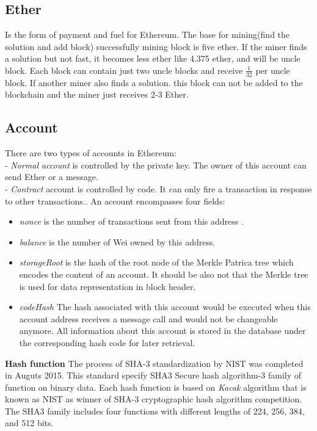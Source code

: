 \subsection{Ether}
 Is the form of payment and fuel for Ethereum. The base for mining(find the solution and add block) successfully mining block is five ether. If the miner finds a solution but not fast, it becomes less ether like 4.375 ether, and will be uncle block. Each block can contain just two uncle blocks and receive $\frac{1}{32}$ per uncle block. If another miner also finds a solution. this block can not be added to the blockchain and the miner just receives 2-3 Ether\cite{Egbertsen}. 
\subsection{Account}
There are two types of accounts in Ethereum:\\
- \textit{Normal account} is controlled by the private key. The owner of this account can send Ether or a message.\\
- \textit{Contract} account is controlled by code. It can only fire a transaction in response to other transactions.\cite{Egbertsen}. An account encompasses four fields:\\
 \begin{itemize}
     \item \textit{nonce} is the number of transactions sent from this address \cite{Gavin}.
     \item \textit{balance} is the number of Wei owned by this address\cite{Gavin}.
     \item \textit{storageRoot} is the hash of the root node of the Merkle Patrica tree which encodes the content of an account. It should be also not that the Merkle tree is used for data representation in block header\cite{Gavin}.
     \item \textit{codeHash}
     The hash associated with this account would be executed when this account address receives a message call and would not be changeable anymore. All information about this account is stored in the database under the corresponding hash code for later retrieval. \\
    
\end{itemize}
\textbf{Hash function}
The process of SHA-3 standardization by NIST was completed in Auguts 2015.
This standard specify SHA3 Secure hash algorithm-3 family of function on binary data. Each hash function is based on \textit{Kacak} algorithm that is known as NIST as winner of SHA-3 cryptographic hash algorithm competition. The SHA3 family includes four functions with different lengths of 224, 256, 384, and 512 bits. 
